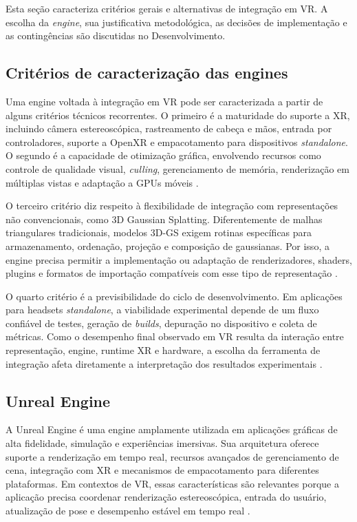 Esta seção caracteriza critérios gerais e alternativas de integração em VR. A escolha da \textit{engine}, sua justificativa metodológica, as decisões de implementação e as contingências são discutidas no Desenvolvimento.

\subsection{Critérios de caracterização das engines}

Uma engine voltada à integração em VR pode ser caracterizada a partir de alguns critérios técnicos recorrentes. O primeiro é a maturidade do suporte a XR, incluindo câmera estereoscópica, rastreamento de cabeça e mãos, entrada por controladores, suporte a OpenXR e empacotamento para dispositivos \textit{standalone}. O segundo é a capacidade de otimização gráfica, envolvendo recursos como controle de qualidade visual, \textit{culling}, gerenciamento de memória, renderização em múltiplas vistas e adaptação a GPUs móveis \cite{xu2023,tu2025,metaquest3s2024}.

O terceiro critério diz respeito à flexibilidade de integração com representações não convencionais, como 3D Gaussian Splatting. Diferentemente de malhas triangulares tradicionais, modelos 3D-GS exigem rotinas específicas para armazenamento, ordenação, projeção e composição de gaussianas. Por isso, a engine precisa permitir a implementação ou adaptação de renderizadores, shaders, plugins e formatos de importação compatíveis com esse tipo de representação \cite{kerbl2023,jin2024,fei2025survey3dgs,chen2024survey3dgs}.

O quarto critério é a previsibilidade do ciclo de desenvolvimento. Em aplicações para headsets \textit{standalone}, a viabilidade experimental depende de um fluxo confiável de testes, geração de \textit{builds}, depuração no dispositivo e coleta de métricas. Como o desempenho final observado em VR resulta da interação entre representação, engine, runtime XR e hardware, a escolha da ferramenta de integração afeta diretamente a interpretação dos resultados experimentais \cite{xu2023,tu2025,metaquest3s2024}.

\subsection{Unreal Engine}

A Unreal Engine é uma engine amplamente utilizada em aplicações gráficas de alta fidelidade, simulação e experiências imersivas. Sua arquitetura oferece suporte a renderização em tempo real, recursos avançados de gerenciamento de cena, integração com XR e mecanismos de empacotamento para diferentes plataformas. Em contextos de VR, essas características são relevantes porque a aplicação precisa coordenar renderização estereoscópica, entrada do usuário, atualização de pose e desempenho estável em tempo real \cite{xu2023,tu2025,metaquest3s2024}.

